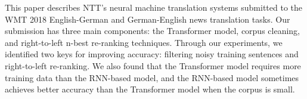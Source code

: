 This paper describes NTT's neural machine translation systems submitted to the WMT 2018 English-German and German-English news translation tasks. Our submission has three main components: the Transformer model, corpus cleaning, and right-to-left n-best re-ranking techniques. Through our experiments, we identified two keys for improving accuracy: filtering noisy training sentences and right-to-left re-ranking. We also found that the Transformer model requires more training data than the RNN-based model, and the RNN-based model sometimes achieves better accuracy than the Transformer model when the corpus is small.
